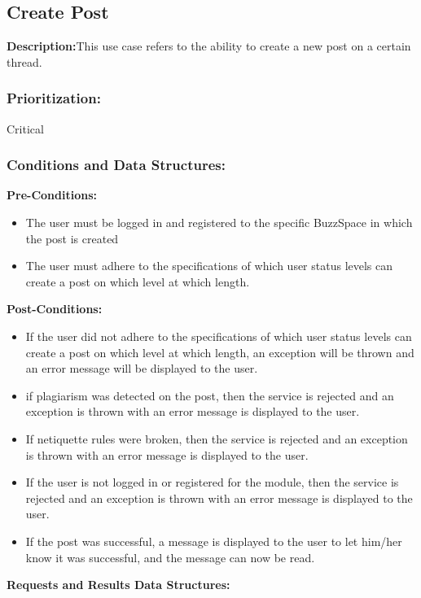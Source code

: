 \documentclass[a4paper,11pt]{article}
\begin{document}
\subsection{Create Post}
\textbf{Description:}This use case refers to the ability to create a new post on a certain thread. 
\subsubsection{Prioritization:} Critical
\subsubsection{Conditions and Data Structures:}
\textbf{Pre-Conditions:}
\begin{itemize}
	\item The user must be logged in and registered to the specific BuzzSpace in which the post is created
	\item The user must adhere to the specifications of which user status levels can create a post on which level at which length.
\end{itemize}
\textbf{Post-Conditions:}
\begin{itemize}
	\item If the user did not adhere to the specifications of which user status levels can create a post on which level at which length, an exception will be thrown and an error
	message will be displayed to the user.
	\item if plagiarism was detected on the post, then the service is rejected and an exception is thrown with an error message is displayed to the user.
	\item If netiquette rules were broken,  then the service is rejected and an exception is thrown with an error message is displayed to the user.
	\item If the user is not logged in or registered for the module, then the service is rejected and an exception is thrown with an error message is displayed to the user.
	\item If the post was successful, a message is displayed to the user to let him/her know it was successful, and the message can now be read.
\end{itemize}
\textbf{Requests and Results Data Structures:}
\end{document}

